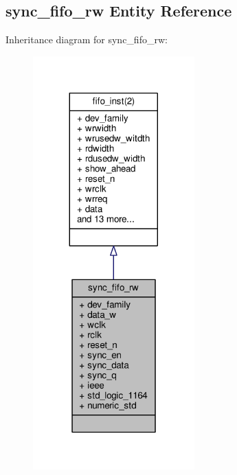 \subsection{sync\+\_\+fifo\+\_\+rw Entity Reference}
\label{classsync__fifo__rw}


Inheritance diagram for sync\+\_\+fifo\+\_\+rw\+:\nopagebreak
\begin{figure}[H]
\begin{center}
\leavevmode
\includegraphics[width=176pt]{d5/d25/classsync__fifo__rw__inherit__graph}
\end{center}
\end{figure}


